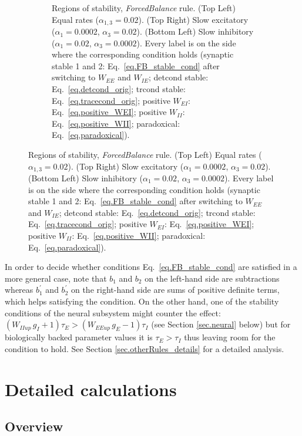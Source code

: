 \documentclass[twocolumn]{article}
\newcommand{\EE}{\mathit{EE}}
\newcommand{\EI}{\mathit{EI}}
\newcommand{\IE}{\mathit{IE}}
\newcommand{\II}{\mathit{II}}
\newcommand{\up}{\mathit{up}}
\begin{document}
\begin{figure}[!ht]
{\begin{figure}[H]
\caption{Regions of stability, {\em ForcedBalance} rule. (Top Left) Equal rates ($\alpha_{1,3}=0.02$). (Top Right) Slow excitatory ($\alpha_1=0.0002$, $\alpha_3=0.02$). (Bottom Left) Slow inhibitory ($\alpha_1=0.02$, $\alpha_3=0.0002$). Every label is on the side where the  corresponding  condition  holds (synaptic stable 1 and 2: Eq.\ \ref{eq.FB_stable_cond} after switching to $W_{\EE}$ and $W_{\IE}$; detcond stable: Eq.\ \ref{eq.detcond_orig}; trcond stable: Eq.\ \ref{eq.tracecond_orig}; positive $W_{\EI}$: Eq.\ \ref{eq.positive_WEI}; positive $W_{\II}$: Eq.\ \ref{eq.positive_WII}; paradoxical: Eq.\ \ref{eq.paradoxical}).}
\label{fig.FB_stability}
\end{figure}}
\end{figure}




In order to decide whether conditions Eq.\ \ref{eq.FB_stable_cond} are satisfied in a more general case, note that $b_1$ and $b_2$ on the left-hand side are subtractions whereas $b_1^\prime$ and $b_2^\prime$ on the right-hand side are sums of positive definite terms, which helps satisfying the condition. On the other hand, one of the stability conditions of the neural subsystem might counter the effect: $(W_{\II\up} \, g_I + 1)\tau_E > (W_{\EE\up} \, g_E - 1)\tau_I$ (see Section \ref{sec.neural} below) but for biologically backed parameter values it is $\tau_E > \tau_I$ thus leaving room for the condition to hold. See Section \ref{sec.otherRules_details} for a detailed analysis.




\section{Detailed calculations}
\label{sec.Details}

\subsection{Overview}
\end{document}
